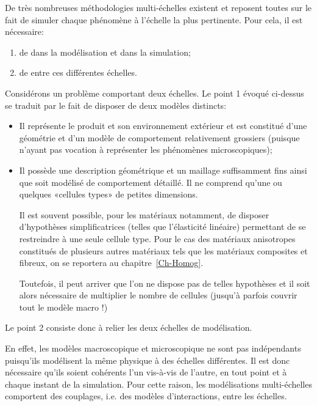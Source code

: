 \medskip
De très nombreuses méthodologies multi-échelles existent et reposent toutes sur le fait de simuler chaque phénomène à l'échelle la plus pertinente. Pour cela, il est nécessaire:
\begin{enumerate}
  \item de  dans la modélisation et dans la simulation;
  \item de  entre ces différentes échelles.
\end{enumerate}

\medskip
Considérons un problème comportant deux échelles. Le point 1 évoqué ci-dessus se traduit par le fait de disposer de deux modèles distincts:
\begin{itemize}
  \item {}

	Il représente le produit et son environnement extérieur et est constitué d'une géométrie et d'un modèle de comportement relativement grossiers (puisque n'ayant pas vocation à représenter les phénomènes microscopiques);
  \item {}

	Il possède une description géométrique et un maillage suffisamment fins ainsi que soit modélisé de comportement détaillé. Il ne comprend qu'une ou quelques «cellules types» de petites dimensions.

	Il est souvent possible, pour les matériaux notamment, de disposer d'hypothèses simplificatrices (telles que l'élasticité linéaire) permettant de se restreindre à une seule cellule type. Pour le cas des matériaux anisotropes constitués de plusieurs autres matériaux tels que les matériaux composites et fibreux, on se reportera au chapitre~\ref{Ch-Homog}. 

	Toutefois, il peut arriver que l'on ne dispose pas de telles hypothèses et il soit alors nécessaire de multiplier le nombre de cellules (jusqu'à parfois couvrir tout le modèle macro !)
\end{itemize}

\medskip
Le point 2 consiste donc à relier les deux échelles de modélisation.

En effet, les modèles macroscopique et microscopique ne sont pas indépendants puisqu'ils modélisent la même physique à des échelles différentes. Il est donc nécessaire qu'ils soient cohérents l'un vis-à-vis de l'autre, en tout point et à chaque instant de la simulation. Pour cette raison, les modélisations multi-échelles comportent des couplages, i.e. des modèles d'interactions, entre les échelles.


